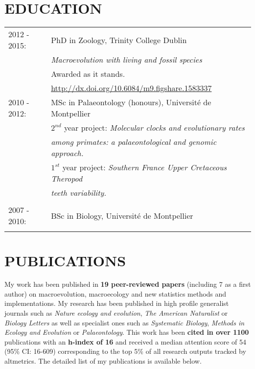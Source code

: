 \documentclass[10pt,a4paper]{article}
\begin{document}
{\begin{tabular}{ll}
\end{tabular}

\section{EDUCATION}
\raggedright
\begin{tabular}{ll} 
2012 - 2015: & PhD in Zoology, Trinity College Dublin\\
& \textit{Macroevolution with living and fossil species} \\
& Awarded as it stands. \\
& \href{http://figshare.com/articles/Macroevolution_with_living_and_fossil_species/1583337}{http://dx.doi.org/10.6084/m9.figshare.1583337} \\
2010 - 2012: & MSc in Palaeontology (honours), Universit\'{e} de Montpellier\\
& $2^{nd}$ year project: \textit{Molecular clocks and evolutionary rates}\\
& \textit{among primates: a palaeontological and genomic approach.} \\
& $1^{st}$ year project: \textit{Southern France Upper Cretaceous Theropod}\\
& \textit{teeth variability.} \\
& \\
2007 - 2010: & BSc in Biology, Universit\'{e} de Montpellier\\
& \\
\end{tabular}



\section{PUBLICATIONS}
My work has been published in \textbf{19 peer-reviewed papers} (including 7 as a first author) on macroevolution, macroecology and new statistics methods and implementations.
My research has been published in high profile generalist journals such as \textit{Nature ecology and evolution}, \textit{The American Naturalist} or \textit{Biology Letters} as well as specialist ones such as \textit{Systematic Biology}, \textit{Methods in Ecology and Evolution} or \textit{Palaeontology}.
This work has been \textbf{cited in over 1100} %
publications with an \textbf{h-index of 16} %
and received a median attention score of 54 (95\% CI: 16-609) %
corresponding to the top 5\% of all research outputs tracked by altmetrics.
The detailed list of my publications is available below.

}
\end{document}

